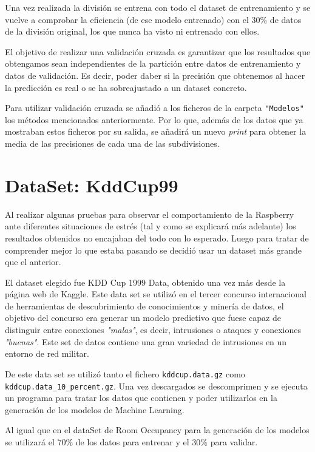 \documentclass[a4paper, 12pt]{book}
\begin{document}
Una vez realizada la división se entrena con todo el dataset de entrenamiento y se vuelve a comprobar la eficiencia (de ese modelo entrenado) con el 30\% de datos de la división original, los que nunca ha visto ni entrenado con ellos.

El objetivo de realizar una validación cruzada es garantizar que los resultados que obtengamos sean independientes de la partición entre datos de entrenamiento y datos de validación. Es decir, poder daber si la precisión que obtenemos al hacer la predicción es real o se ha sobreajustado a un dataset concreto.
 
 Para utilizar validación cruzada se añadió a los ficheros de la carpeta \texttt{"Modelos"} los métodos mencionados anteriormente. Por lo que, además de los datos que ya mostraban estos ficheros por su salida, se añadirá un nuevo \textit{print} para obtener la media de las precisiones de cada una de las subdivisiones.
 


\section{DataSet: KddCup99}
\label{subsec:dataset_kddcup99}

Al realizar algunas pruebas para observar el comportamiento de la Raspberry ante diferentes situaciones de estrés (tal y como se explicará más adelante) los resultados obtenidos no encajaban del todo con lo esperado. Luego para tratar de comprender mejor lo que estaba pasando se decidió usar un dataset más grande que el anterior.

El dataset elegido fue KDD Cup 1999 Data\cite{DataSetKddCup99}, obtenido una vez más desde la página web de Kaggle. Este data set se utilizó en el tercer concurso internacional de herramientas de descubrimiento de conocimientos y minería de datos, el objetivo del concurso era generar un modelo predictivo que fuese capaz de distinguir entre conexiones \textit{"malas"}, es decir, intrusiones o ataques y conexiones \textit{"buenas"}. Este set de datos contiene una gran variedad de intrusiones en un entorno de red militar. 

De este data set se utilizó tanto el fichero \texttt{kddcup.data.gz} como \texttt{kddcup.data\_10\_percent.gz}. Una vez descargados se descomprimen y se ejecuta un programa para tratar los datos que contienen y poder utilizarlos en la generación de los modelos de Machine Learning.

Al igual que en el dataSet de Room Occupancy para la generación de los modelos se utilizará el 70\% de los datos para entrenar y el 30\% para validar.
\end{document}

